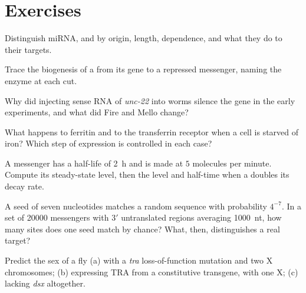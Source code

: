 \section{Exercises}

\begin{exercise}[$\star$]\label{exo:b3:rna-regulation:1}
Distinguish miRNA,  and  by origin, length,  dependence,
and what they do to their targets.
\end{exercise}

\begin{exercise}[$\star$]\label{exo:b3:rna-regulation:2}
Trace the biogenesis of a  from its gene to a repressed
messenger, naming the enzyme at each cut.
\end{exercise}

\begin{exercise}[$\star$]\label{exo:b3:rna-regulation:3}
Why did injecting sense RNA of \emph{unc-22} into worms silence the
gene in the early experiments, and what did Fire and Mello change?
\end{exercise}

\begin{exercise}[$\star$]\label{exo:b3:rna-regulation:4}
What happens to ferritin and to the transferrin receptor when a cell
is starved of iron? Which step of expression is controlled in each
case?
\end{exercise}

\begin{exercise}[$\star\star$]\label{exo:b3:rna-regulation:5}
A messenger has a half-life of \qty{2}{h} and is made at $5$
molecules per minute. Compute its steady-state level, then the level
and half-time when a  doubles its decay rate.
\end{exercise}

\begin{exercise}[$\star\star$]\label{exo:b3:rna-regulation:6}
A seed of seven nucleotides matches a random sequence with probability
$4^{-7}$. In a set of \num{20000} messengers with 3$'$ untranslated
regions averaging \qty{1000}{nt}, how many sites does one  seed
match by chance? What, then, distinguishes a real target?
\end{exercise}

\begin{exercise}[$\star\star$]\label{exo:b3:rna-regulation:7}
Predict the sex of a fly (a) with a \emph{tra} loss-of-function
mutation and two X chromosomes; (b) expressing TRA from a constitutive
transgene, with one X; (c) lacking \emph{dsx} altogether.
\end{exercise}

